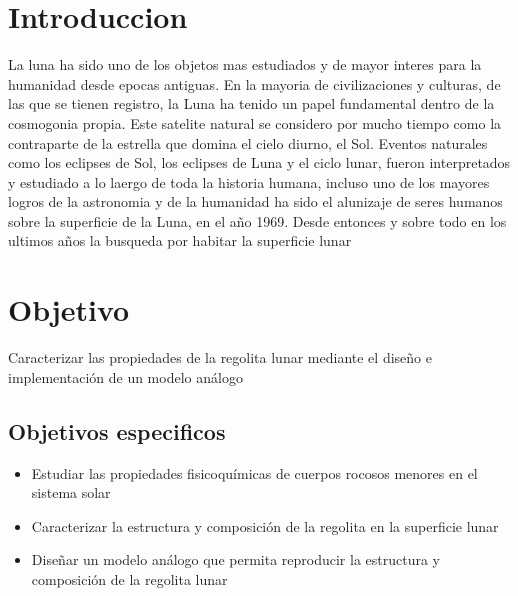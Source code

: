 \documentclass[12pt]{article}
\begin{document}
\section{Introduccion}
La luna ha sido uno de los objetos mas estudiados y de mayor interes para la humanidad desde epocas antiguas. En la mayoria de civilizaciones y culturas,
de las que se tienen registro, la Luna ha tenido un papel fundamental dentro de la cosmogonia propia. Este satelite natural se considero por mucho tiempo como 
la contraparte de la estrella que domina el cielo diurno, el Sol. Eventos naturales como los eclipses de Sol, los eclipses de Luna y el ciclo lunar, fueron interpretados
y estudiado a lo laergo de toda la historia humana, incluso uno de los mayores logros de la astronomia y de la humanidad ha sido el alunizaje de seres humanos sobre la superficie 
de la Luna, en el año 1969. Desde entonces y sobre todo en los ultimos años la busqueda por habitar la superficie lunar


\section{Objetivo}

Caracterizar las propiedades de la regolita lunar mediante el diseño e implementación  de un modelo análogo

\subsection{Objetivos especificos}
\begin{itemize}
    \item Estudiar  las propiedades fisicoquímicas  de cuerpos rocosos menores en el sistema solar
    \item Caracterizar  la estructura y composición de la regolita en la superficie lunar
    \item Diseñar un modelo análogo que permita reproducir la estructura y composición de la regolita lunar
\end{itemize}


% 
% 
% 
% 
\end{document}
